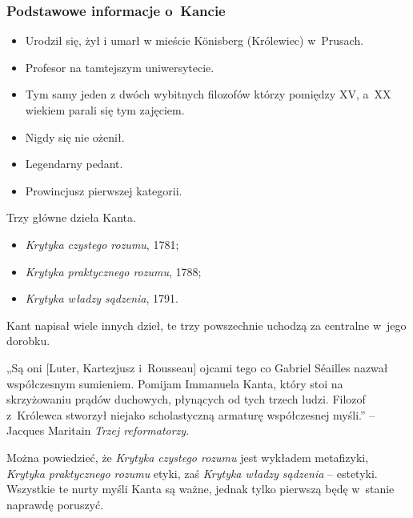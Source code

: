\documentclass[10pt,t]{beamer}
\begin{document}
\begin{frame}
  \frametitle{Podstawowe informacje o~Kancie}



  \begin{itemize}

  \item Urodził się, żył i umarł w mieście K\"{o}nisberg (Królewiec)
    w~Prusach.

  \item Profesor na tamtejszym uniwersytecie.

  \item Tym samy jeden z dwóch wybitnych filozofów którzy pomiędzy XV, a~XX
    wiekiem parali się tym zajęciem.

  \item Nigdy się nie ożenił.

  \item Legendarny pedant.

  \item Prowincjusz pierwszej kategorii.

  \end{itemize}

  Trzy główne dzieła Kanta.
  \begin{itemize}

  \item \textit{Krytyka czystego rozumu}, 1781;

  \item \textit{Krytyka praktycznego rozumu}, 1788;

  \item \textit{Krytyka władzy sądzenia}, 1791.

  \end{itemize}
  Kant napisał wiele innych dzieł, te trzy powszechnie uchodzą za centralne
  w~jego dorobku.

  „Są oni [Luter, Kartezjusz i~Rousseau] ojcami tego co Gabriel S\'{e}ailles nazwał współczesnym
  sumieniem. Pomijam Immanuela Kanta, który stoi na skrzyżowaniu prądów duchowych, płynących od tych trzech ludzi. Filozof z~Królewca stworzył niejako scholastyczną armaturę współczesnej myśli.” -- Jacques Maritain \textit{Trzej reformatorzy}.

  Można powiedzieć, że \textit{Krytyka czystego rozumu} jest wykładem
  metafizyki, \textit{Krytyka praktycznego rozumu} etyki, zaś
  \textit{Krytyka władzy sądzenia} -- estetyki. Wszystkie te nurty myśli
  Kanta są ważne, jednak tylko pierwszą będę w~stanie naprawdę poruszyć.

\end{frame}
\end{document}
